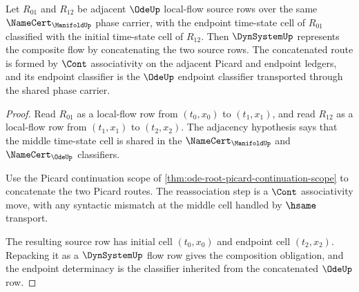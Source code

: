 \begin{theorem}
\label{thm:dynsystem-composition-flow-obligation}
Let $R_{01}$ and $R_{12}$ be adjacent $\OdeUp$ local-flow source rows over the
same $\NameCert_{\ManifoldUp}$ phase carrier, with the endpoint time-state
cell of $R_{01}$ classified with the initial time-state cell of $R_{12}$.
Then $\DynSystemUp$ represents the composite flow by concatenating the two
source rows. The concatenated route is formed by $\Cont$ associativity on the
adjacent Picard and endpoint ledgers, and its endpoint classifier is the
$\OdeUp$ endpoint classifier transported through the shared phase carrier.
\end{theorem}
\begin{proof}
Read $R_{01}$ as a local-flow row from $(t_0,x_0)$ to $(t_1,x_1)$, and read
$R_{12}$ as a local-flow row from $(t_1,x_1)$ to $(t_2,x_2)$. The adjacency
hypothesis says that the middle time-state cell is shared in the
$\NameCert_{\ManifoldUp}$ and $\NameCert_{\OdeUp}$ classifiers.

Use the Picard continuation scope of
\autoref{thm:ode-root-picard-continuation-scope} to concatenate the two
Picard routes. The reassociation step is a $\Cont$ associativity move, with
any syntactic mismatch at the middle cell handled by $\hsame$ transport.

The resulting source row has initial cell $(t_0,x_0)$ and endpoint cell
$(t_2,x_2)$. Repacking it as a $\DynSystemUp$ flow row gives the composition
obligation, and the endpoint determinacy is the classifier inherited from the
concatenated $\OdeUp$ row.
\end{proof}

